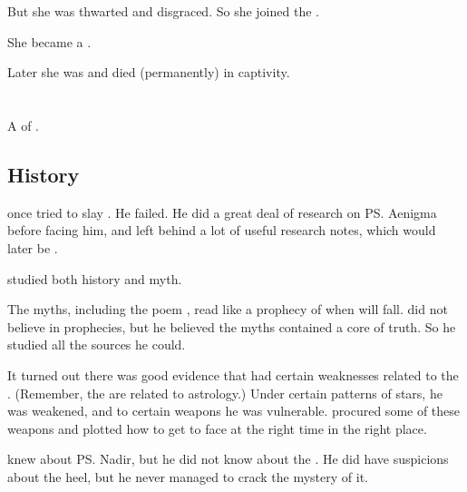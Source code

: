 But she was thwarted and disgraced. 
So she joined the . 

She became a \Malach.

Later she was  and died (permanently) in captivity. 















\section{\Lothagiel}
\index{\Lothagiel}
A \ketheran{} \resphan{} of \TiphredSerah. 









\subsection{History}
\Lothagiel{} once tried to slay \Ishnaruchaefir{}. 
He failed. 
He did a great deal of research on \ps{\Ishnaruchaefir} Aenigma before facing him, and left behind a lot of useful research notes, which would later be . 

\Lothagiel{} studied both history and myth. 

The myths, including the poem \emph{}, read like a prophecy of when \Ishnaruchaefir{} will fall. 
\Lothagiel{} did not believe in prophecies, but he believed the myths contained a core of truth. 
So he studied all the sources he could. 

It turned out there was good evidence that \Ishnaruchaefir{} had certain  weaknesses related to the . 
(Remember, the \matrices{} are related to astrology.) 
Under certain patterns of stars, he was weakened, and to certain weapons he was vulnerable. 
\Lothagiel{} procured some of these weapons and plotted how to get to face \Ishnaruchaefir{} at the right time in the right place. 

\Lothagiel{} knew about \ps{\Ishnaruchaefir} Nadir, but he did not know about the . 
He did have suspicions about the heel, but he never managed to crack the mystery of it. 

